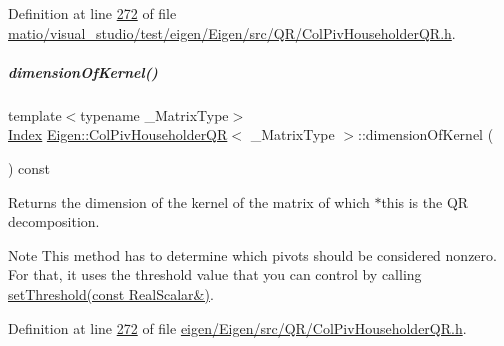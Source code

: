 Definition at line \hyperlink{matio_2visual__studio_2test_2eigen_2_eigen_2src_2_q_r_2_col_piv_householder_q_r_8h_source_l00272}{272} of file \hyperlink{matio_2visual__studio_2test_2eigen_2_eigen_2src_2_q_r_2_col_piv_householder_q_r_8h_source}{matio/visual\+\_\+studio/test/eigen/\+Eigen/src/\+Q\+R/\+Col\+Piv\+Householder\+Q\+R.\+h}.

\mbox{\label{group___q_r___module_a7c9294565d179226133770160b827be1}} 
\subparagraph{\texorpdfstring{dimension\+Of\+Kernel()}{dimensionOfKernel()}\hspace{0.1cm}{\footnotesize\ttfamily [2/2]}}
{\footnotesize\ttfamily template$<$typename \+\_\+\+Matrix\+Type$>$ \\
\hyperlink{namespace_eigen_a62e77e0933482dafde8fe197d9a2cfde}{Index} \hyperlink{group___q_r___module_class_eigen_1_1_col_piv_householder_q_r}{Eigen\+::\+Col\+Piv\+Householder\+QR}$<$ \+\_\+\+Matrix\+Type $>$\+::dimension\+Of\+Kernel (\begin{DoxyParamCaption}{ }\end{DoxyParamCaption}) const\hspace{0.3cm}{\ttfamily [inline]}}

\begin{DoxyReturn}{Returns}
the dimension of the kernel of the matrix of which $\ast$this is the QR decomposition.
\end{DoxyReturn}
\begin{DoxyNote}{Note}
This method has to determine which pivots should be considered nonzero. For that, it uses the threshold value that you can control by calling \hyperlink{group___q_r___module_ae712cdc9f0e521cfc8061bee58ff55ee}{set\+Threshold(const Real\+Scalar\&)}. 
\end{DoxyNote}


Definition at line \hyperlink{eigen_2_eigen_2src_2_q_r_2_col_piv_householder_q_r_8h_source_l00272}{272} of file \hyperlink{eigen_2_eigen_2src_2_q_r_2_col_piv_householder_q_r_8h_source}{eigen/\+Eigen/src/\+Q\+R/\+Col\+Piv\+Householder\+Q\+R.\+h}.

